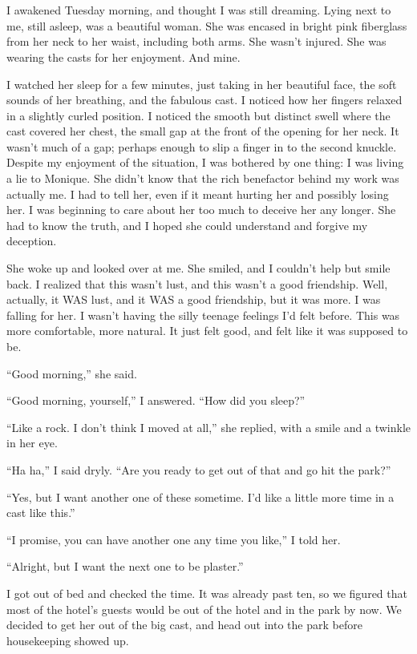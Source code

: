 \chapter{~}
I awakened Tuesday morning, and thought I was still dreaming. Lying next to me, still
asleep, was a beautiful woman. She was encased in bright pink fiberglass from her neck to her
waist, including both arms. She wasn't injured. She was wearing the casts for her enjoyment. And
mine.

I watched her sleep for a few minutes, just taking in her beautiful face, the soft sounds
of her breathing, and the fabulous cast. I noticed how her fingers relaxed in a slightly curled
position. I noticed the smooth but distinct swell where the cast covered her chest, the small
gap at the front of the opening for her neck. It wasn't much of a gap; perhaps enough to slip a
finger in to the second knuckle. Despite my enjoyment of the situation, I was bothered by one
thing: I was living a lie to Monique. She didn't know that the rich benefactor behind my work
was actually me. I had to tell her, even if it meant hurting her and possibly losing her. I was
beginning to care about her too much to deceive her any longer. She had to know the truth, and I
hoped she could understand and forgive my deception.

She woke up and looked over at me. She smiled, and I couldn't help but smile back. I
realized that this wasn't lust, and this wasn't a good friendship. Well, actually, it WAS lust,
and it WAS a good friendship, but it was more. I was falling for her. I wasn't having the silly
teenage feelings I'd felt before. This was more comfortable, more natural. It just felt good,
and felt like it was supposed to be.

``Good morning,'' she said.

``Good morning, yourself,'' I answered. ``How did you sleep?''

``Like a rock. I don't think I moved at all,'' she replied, with a smile and a twinkle in her
eye.

``Ha ha,'' I said dryly. ``Are you ready to get out of that and go hit the park?''

``Yes, but I want another one of these sometime. I'd like a little more time in a cast like
this.''

``I promise, you can have another one any time you like,'' I told her.

``Alright, but I want the next one to be plaster.''

I got out of bed and checked the time. It was already past ten, so we figured that most of
the hotel's guests would be out of the hotel and in the park by now. We decided to get her out
of the big cast, and head out into the park before housekeeping showed up.

